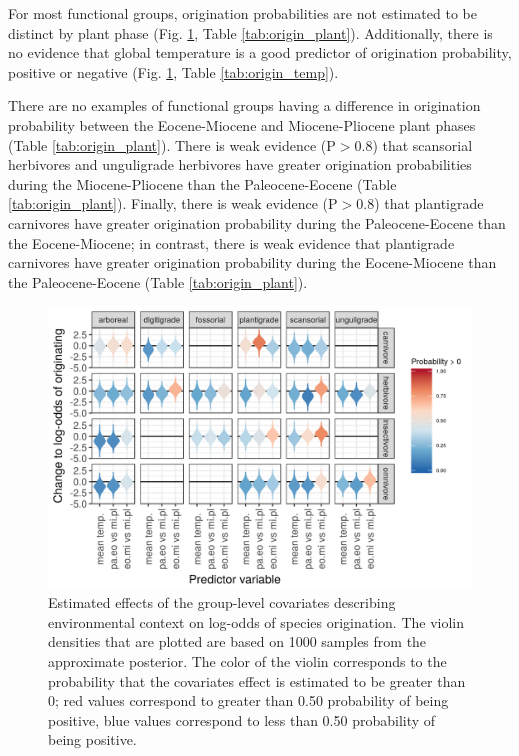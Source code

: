 \documentclass[12pt,letterpaper]{article}
\begin{document}
For most functional groups, origination probabilities are not estimated to be distinct by plant phase (Fig. \ref{fig:group_origin_bd}, Table \ref{tab:origin_plant}). Additionally, there is no evidence that global temperature is a good predictor of origination probability, positive or negative (Fig. \ref{fig:group_origin_bd}, Table \ref{tab:origin_temp}).

There are no examples of functional groups having a difference in origination probability between the Eocene-Miocene and Miocene-Pliocene plant phases (Table \ref{tab:origin_plant}). There is weak evidence (P\(>\)0.8) that scansorial herbivores and unguligrade herbivores have greater origination probabilities during the Miocene-Pliocene than the Paleocene-Eocene (Table \ref{tab:origin_plant}). Finally, there is weak evidence (P\(>\)0.8) that plantigrade carnivores have greater origination probability during the Paleocene-Eocene than the Eocene-Miocene; in contrast, there is weak evidence that plantigrade carnivores have greater origination probability during the Eocene-Miocene than the Paleocene-Eocene (Table \ref{tab:origin_plant}).
\begin{figure}[ht]
  \centering
  \includegraphics[width=\textwidth,height=0.4\textheight,keepaspectratio=true]{figure/group_on_origin_bd}
  \caption{Estimated effects of the group-level covariates describing environmental context on log-odds of species origination. The violin densities that are plotted are based on 1000 samples from the approximate posterior. The color of the violin corresponds to the probability that the covariates effect is estimated to be greater than 0; red values correspond to greater than 0.50 probability of being positive, blue values correspond to less than 0.50 probability of being positive.} 
  \label{fig:group_origin_bd}
\end{figure}
\end{document}
